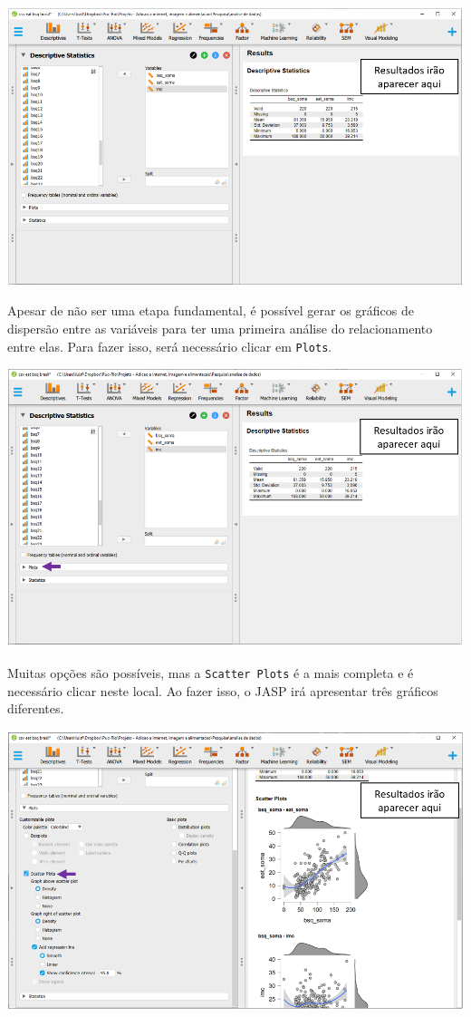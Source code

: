\documentclass[
]{book}
\begin{document}
\includegraphics{./img/cap_reg_multipla_descriptives.png}

Apesar de não ser uma etapa fundamental, é possível gerar os gráficos de dispersão entre as variáveis para ter uma primeira análise do relacionamento entre elas. Para fazer isso, será necessário clicar em \texttt{Plots}.

\includegraphics{./img/cap_reg_multipla_plots.png}

Muitas opções são possíveis, mas a \texttt{Scatter\ Plots} é a mais completa e é necessário clicar neste local. Ao fazer isso, o JASP irá apresentar três gráficos diferentes.

\includegraphics{./img/cap_reg_multipla_plots2.png}
\end{document}
